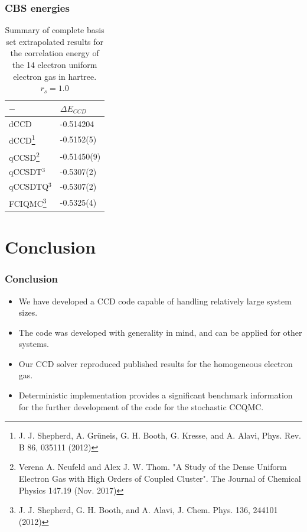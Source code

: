 \documentclass{beamer}
\begin{document}
\begin{frame}
\frametitle{CBS energies}
\begin{table}[h]
\centering
\caption{\tiny Summary of complete basis set extrapolated results for the correlation energy of the 14 electron uniform electron gas in hartree. $r_s = 1.0$} \label{tab:CCDQMC}
\tiny  %
\begin{tabular}{ll}
$-$ &  $\Delta E_{CCD}$ \\
\hline
\hline
dCCD & -0.514204 \\
dCCD\footnote{\tiny J. J. Shepherd, A. Grüneis, G. H. Booth, G. Kresse, and A. Alavi, Phys. Rev. B 86, 035111 (2012)} & -0.5152(5) \\
\hline
qCCSD\footnote{\tiny Verena A. Neufeld and Alex J. W. Thom. "A Study of the Dense Uniform Electron Gas with High Orders of Coupled Cluster". The Journal of Chemical Physics 147.19 (Nov. 2017)} & -0.51450(9) \\
qCCSDT$^3$ & -0.5307(2) \\
qCCSDTQ$^3$ & -0.5307(2) \\			
\hline
FCIQMC\footnote{\tiny J. J. Shepherd, G. H. Booth, and A. Alavi, J. Chem. Phys. 136, 244101 (2012)} & -0.5325(4) \\
\hline     
\end{tabular}
\end{table}



\end{frame}


\section{Conclusion}

\begin{frame}
\frametitle{Conclusion}
\begin{itemize}
\item We have developed a CCD code capable of handling relatively large system sizes. 
\item The code was developed with generality in mind, and can be applied for other systems.
\item Our CCD solver reproduced published results for the homogeneous electron gas.
\item Deterministic implementation provides a significant benchmark information for the further development of the code for the stochastic CCQMC.
\end{itemize}
\end{frame}
\end{document}
